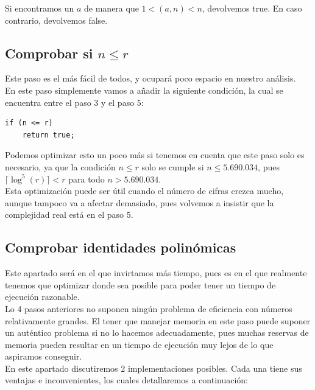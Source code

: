 Si encontramos un $a$ de manera que $1 < (a, n) < n$, devolvemos true. En caso contrario, devolvemos false.

\subsection{Comprobar si $n \leq r$}

Este paso es el más fácil de todos, y ocupará poco espacio en nuestro análisis.\\

En este paso simplemente vamos a añadir la siguiente condición, la cual se encuentra entre el paso $3$ y el paso $5$:\\

\begin{lstlisting}
if (n <= r)
	return true;
\end{lstlisting}

Podemos optimizar esto un poco más si tenemos en cuenta que este paso solo es necesario, ya que la condición $n \leq r$ solo se cumple si $n \leq 5.690.034$, pues $\lceil \log^5(r) \rceil < r$ para todo $n > 5.690.034$.\\

Esta optimización puede ser útil cuando el número de cifras crezca mucho, aunque tampoco va a afectar demasiado, pues volvemos a insistir que la complejidad real está en el paso 5.

\subsection{Comprobar identidades polinómicas}

Este apartado será en el que invirtamos más tiempo, pues es en el que realmente tenemos que optimizar donde sea posible para poder tener un tiempo de ejecución razonable.\\

Lo 4 pasos anteriores no suponen ningún problema de eficiencia con números relativamente grandes. El tener que manejar memoria en este paso puede suponer un auténtico problema si no lo hacemos adecuadamente, pues muchas reservas de memoria pueden resultar en un tiempo de ejecución muy lejos de lo que aspiramos conseguir.\\

En este apartado discutiremos 2 implementaciones posibles. Cada una tiene sus ventajas e inconvenientes, los cuales detallaremos a continuación:\\

